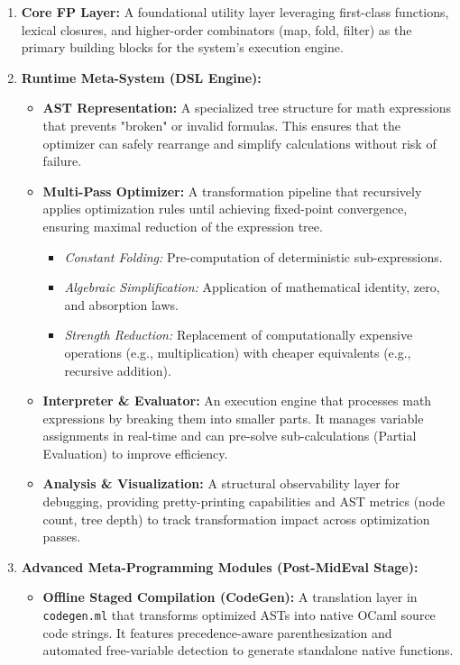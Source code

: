 \documentclass[12pt]{article}
\begin{document}
\begin{enumerate}
    \item \textbf{Core FP Layer:}  
    A foundational utility layer leveraging first-class functions, lexical closures, and higher-order combinators (map, fold, filter) as the primary building blocks for the system’s execution engine.

    \item \textbf{Runtime Meta-System (DSL Engine):}
    \begin{itemize}
       
        \item \textbf{AST Representation:}  
A specialized tree structure for math expressions that prevents "broken" or invalid formulas. This ensures that the optimizer can safely rearrange and simplify calculations without risk of failure.

        \item \textbf{Multi-Pass Optimizer:}  
        A transformation pipeline that recursively applies optimization rules until achieving fixed-point convergence, ensuring maximal reduction of the expression tree.
        \begin{itemize}
            \item \textit{Constant Folding:} Pre-computation of deterministic sub-expressions.
            \item \textit{Algebraic Simplification:} Application of mathematical identity, zero, and absorption laws.
            \item \textit{Strength Reduction:} Replacement of computationally expensive operations (e.g., multiplication) with cheaper equivalents (e.g., recursive addition).
        \end{itemize}

        \item \textbf{Interpreter \& Evaluator:}  
An execution engine that processes math expressions by breaking them into smaller parts. It manages variable assignments in real-time and can pre-solve sub-calculations (Partial Evaluation) to improve efficiency.

        \item \textbf{Analysis \& Visualization:}
        A structural observability layer for debugging, providing pretty-printing capabilities and AST metrics (node count, tree depth) to track transformation impact across optimization passes.
    \end{itemize}

    \item \textbf{Advanced Meta-Programming Modules (Post-MidEval Stage):}
    \begin{itemize}
        \item \textbf{Offline Staged Compilation (CodeGen):}  
        A translation layer in \texttt{codegen.ml} that transforms optimized ASTs into native OCaml source code strings. It features precedence-aware parenthesization and automated free-variable detection to generate standalone native functions.
        

\end{itemize}
\end{enumerate}
\end{document}
